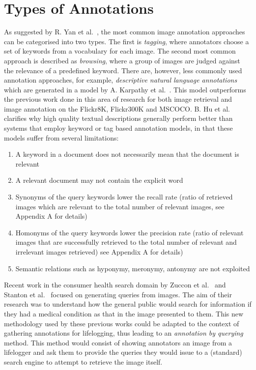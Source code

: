 \section{Types of Annotations}
As suggested by R. Yan et al.~\cite{yan2008learning}, the most common image annotation approaches can be categorised into two types. The first is \textit{tagging}, where annotators choose a set of keywords from a vocabulary for each image. The second most common approach is described as \textit{browsing}, where a group of images are judged against the relevance of a predefined keyword. There are, however, less commonly used annotation approaches, for example, \textit{descriptive natural language annotations} which are generated in a model by A. Karpathy et al.~\cite{karpathy2015deep}. This model outperforms the previous work done in this area of research for both image retrieval and image annotation on the Flickr8K, Flickr300K and MSCOCO. B. Hu et al.~\cite{hu2003ontology} clarifies why high quality textual descriptions generally perform better than systems that employ keyword or tag based annotation models, in that these models suffer from several limitations:
\begin{enumerate}
    \item A keyword in a document does not necessarily mean that the document is relevant
    \item A relevant document may not contain the explicit word
    \item Synonyms of the query keywords lower the recall rate (ratio of retrieved images which are relevant to the total number of relevant images, see Appendix A for details)
    \item Homonyms of the query keywords lower the precision rate  (ratio of relevant images that are successfully retrieved to the total number of relevant and irrelevant images retrieved) see Appendix A for details)
    \item Semantic relations such as hyponymy, meronymy, antonymy are not exploited
\end{enumerate}

Recent work in the consumer health search domain by Zuccon et al.~\cite{quteprints82599} and Stanton et al.~\cite{stanton2014circumlocution} focused on generating queries from images. The aim of their research was to understand how the general public would search for information if they had a medical condition as that in the image presented to them. This new methodology used by these previous works could be adapted to the context of gathering annotations for lifelogging, thus leading to an \textit{annotation by querying} method. This method would consist of showing annotators an image from a lifelogger and ask them to provide the queries they would issue to a (standard) search engine to attempt to retrieve the image itself.

